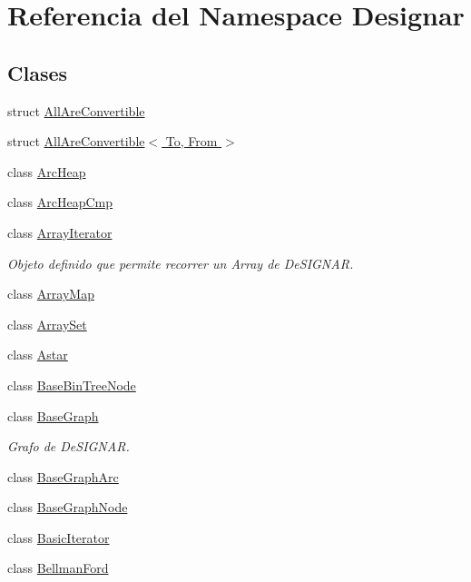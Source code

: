 \hypertarget{namespace_designar}{}\section{Referencia del Namespace Designar}
\label{namespace_designar}
\subsection*{Clases}
\begin{DoxyCompactItemize}
\item 
struct \hyperlink{struct_designar_1_1_all_are_convertible}{All\+Are\+Convertible}
\item 
struct \hyperlink{struct_designar_1_1_all_are_convertible_3_01_to_00_01_from_01_4}{All\+Are\+Convertible$<$ To, From $>$}
\item 
class \hyperlink{class_designar_1_1_arc_heap}{Arc\+Heap}
\item 
class \hyperlink{class_designar_1_1_arc_heap_cmp}{Arc\+Heap\+Cmp}
\item 
class \hyperlink{class_designar_1_1_array_iterator}{Array\+Iterator}
\begin{DoxyCompactList}\small\item\em Objeto definido que permite recorrer un Array de De\+S\+I\+G\+N\+AR. \end{DoxyCompactList}\item 
class \hyperlink{class_designar_1_1_array_map}{Array\+Map}
\item 
class \hyperlink{class_designar_1_1_array_set}{Array\+Set}
\item 
class \hyperlink{class_designar_1_1_astar}{Astar}
\item 
class \hyperlink{class_designar_1_1_base_bin_tree_node}{Base\+Bin\+Tree\+Node}
\item 
class \hyperlink{class_designar_1_1_base_graph}{Base\+Graph}
\begin{DoxyCompactList}\small\item\em Grafo de De\+S\+I\+G\+N\+AR. \end{DoxyCompactList}\item 
class \hyperlink{class_designar_1_1_base_graph_arc}{Base\+Graph\+Arc}
\item 
class \hyperlink{class_designar_1_1_base_graph_node}{Base\+Graph\+Node}
\item 
class \hyperlink{class_designar_1_1_basic_iterator}{Basic\+Iterator}
\item 
class \hyperlink{class_designar_1_1_bellman_ford}{Bellman\+Ford}

\end{DoxyCompactItemize}
